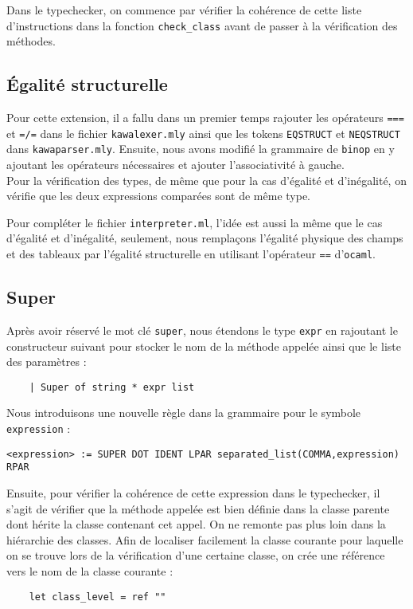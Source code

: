 \documentclass{article}
\begin{document}
Dans le typechecker, on commence par vérifier la cohérence de cette liste 
d'instructions dans la fonction \texttt{check\_class} avant de passer à la vérification des méthodes.


\subsection{Égalité structurelle}
Pour cette extension, il a fallu dans un premier temps rajouter les opérateurs \texttt{===} et \texttt{=/=} dans le fichier \texttt{kawalexer.mly} ainsi que 
les tokens \texttt{EQSTRUCT} et \texttt{NEQSTRUCT} 
dans \texttt{kawaparser.mly}. Ensuite, nous avons modifié la grammaire de 
\texttt{binop} en y ajoutant les opérateurs nécessaires 
et ajouter l'associativité à gauche. \\

Pour la vérification des types, de même que pour la cas d'égalité et d'inégalité, on vérifie que les deux expressions comparées sont de même type.

Pour compléter le fichier \texttt{interpreter.ml}, l'idée est aussi la même que le cas d'égalité et d'inégalité, seulement, 
nous remplaçons l'égalité physique des champs et des tableaux par l'égalité structurelle en utilisant l'opérateur \texttt{==} d'\texttt{ocaml}.

\subsection{Super}
Après avoir réservé le mot clé \texttt{super}, nous étendons le type \texttt{expr} en rajoutant 
le constructeur suivant pour stocker le nom de la méthode appelée ainsi que le liste des paramètres : 
\begin{verbatim}
    | Super of string * expr list
\end{verbatim}

Nous introduisons une nouvelle règle dans la grammaire pour le symbole \texttt{expression} : 
\begin{lstlisting}[style=mystyle]
    <expression> := SUPER DOT IDENT LPAR separated_list(COMMA,expression) RPAR 
\end{lstlisting}

Ensuite, pour vérifier la cohérence de cette expression dans le typechecker, il s'agit de vérifier que la méthode appelée est bien définie dans la classe parente 
dont hérite la classe contenant cet appel. On ne remonte pas plus loin dans la hiérarchie des classes.
Afin de localiser facilement la classe courante pour laquelle on se trouve lors de la vérification d'une certaine 
classe, on crée une référence vers le nom de la classe courante : 
\begin{verbatim}
    let class_level = ref ""
\end{verbatim}
\end{document}
